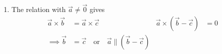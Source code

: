 \begin{enumerate}
\begin{align}
              (\vec{a} + \vec{b}) \times \vec{c} & =
              \begin{vNiceMatrix}[margin]
                  \vec{\hat{i}} & \vec{\hat{j}} & \vec{\hat{k}} \\
                  a_1 + b_1     & a_2 + b_2     & a_3 + b_3     \\
                  c_1           & c_2           & c_3
              \end{vNiceMatrix} \\
                                                 &
              = \begin{vNiceMatrix}[r, margin]
                    \vec{\hat{i}} & \vec{\hat{j}} & \vec{\hat{k}} \\
                    a_1           & a_2           & a_3           \\
                    c_1           & c_2           & c_3
                \end{vNiceMatrix} +
              \begin{vNiceMatrix}[r, margin]
                  \vec{\hat{i}} & \vec{\hat{j}} & \vec{\hat{k}} \\
                  b_1           & b_2           & b_3           \\
                  c_1           & c_2           & c_3
              \end{vNiceMatrix} = \vec{a} \times \vec{c} + \vec{b} \times \vec{c}
          \end{align}
          The relation follows from the properties of determinant addition

    \item The relation with $ \vec{a} \neq \vec{0} $ gives
          \begin{align}
              \vec{a} \times \vec{b}             & = \vec{a} \times \vec{c}        &
              \vec{a} \times (\vec{b} - \vec{c}) & = 0                               \\
              \implies \vec{b}                   & = \vec{c} \quad \text{or} \quad
              \vec{a} \parallel (\vec{b} - \vec{c})
          \end{align}


\end{enumerate}
